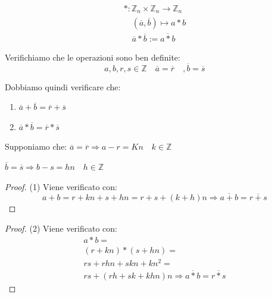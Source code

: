 \documentclass{article}
\theoremstyle{definition}
\begin{document}
\begin{align*}
        * : \mathbb{Z}_n \times \mathbb{Z}_n \to \mathbb{Z}_n \\
        \quad (\overline{a}, \overline{b}) \mapsto a * b \\
        \quad \overline{a} * \overline{b} := \overline{a * b}
\end{align*}

Verifichiamo che le operazioni sono ben definite:
\begin{equation*}
        a,b,r,s \in \mathbb{Z} \quad \overline{a} = \overline{r} \quad ,\overline{b} = \overline{s}
\end{equation*}

Dobbiamo quindi verificare che:
\begin{enumerate}
        \item $\overline{a} + \overline{b} = \overline{r} + \overline{s}$  
        \item $\overline{a} * \overline{b} = \overline{r} * \overline{s}$  
\end{enumerate}

Supponiamo che:
$\overline{a} = \overline{r} \Rightarrow a - r = Kn \quad k \in \mathbb{Z}$ \par 
$\overline{b} = \overline{s} \Rightarrow b - s = hn \quad h \in \mathbb{Z}$ \par 

\begin{tcolorbox}
\begin{proof}
        (1) Viene verificato con:
       \begin{equation*}
               a + b = r + kn + s + hn = r+s + (k+h)n \Rightarrow \overline{a+b} = \overline{r + s}
       \end{equation*}
\end{proof}
\end{tcolorbox}

\begin{tcolorbox}
\begin{proof}
       (2) Viene verificato con:
       \begin{align*}
               a * b = \\
               (r + kn) * (s + hn) = \\
              rs + rhn + skn + kn^2 = \\
               rs + (rh +sk + khn)n \Rightarrow \overline{a*b} = \overline{r * s}
       \end{align*}
\end{proof}
\end{tcolorbox}
\end{document}
